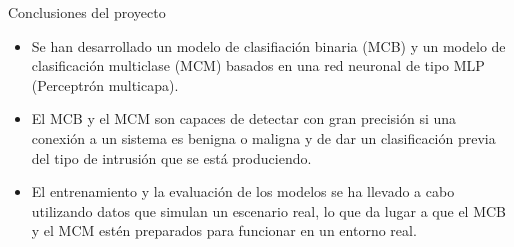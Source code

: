 \begin{frame}{Conclusiones del proyecto}
	\begin{itemize}
	
		\item Se han desarrollado un modelo de clasifiación binaria (MCB) y un modelo de clasificación multiclase (MCM) basados en una red neuronal de tipo MLP (Perceptrón multicapa).
		 \vspace{10mm}
		\item El MCB y el MCM son capaces de detectar con gran precisión si una conexión a un sistema es benigna o maligna y de dar un clasificación previa del tipo de intrusión que se está produciendo.
		 \vspace{10mm}
		\item El entrenamiento y la evaluación de los modelos se ha llevado a cabo utilizando datos que simulan un escenario real, lo que da lugar a que el MCB y el MCM estén preparados para funcionar en un entorno real.
	\end{itemize}
\end{frame}